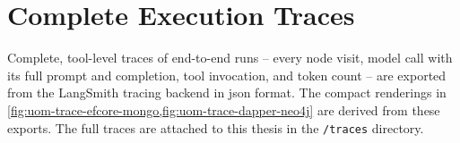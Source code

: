 \section{Complete Execution Traces}
\label{app:full-trace}

Complete, tool-level traces of end-to-end runs -- every node visit, model call with
its full prompt and completion, tool invocation, and token count -- are exported from
the LangSmith tracing backend in \acrshort{json} format. The compact renderings in
\cref{fig:uom-trace-efcore-mongo,fig:uom-trace-dapper-neo4j} are derived from these
exports. The full traces are attached to this thesis in the \texttt{/traces} directory.
